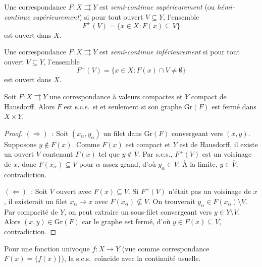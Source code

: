 \begin{definition}
Une correspondance $F\colon X \rightrightarrows Y$ est \emph{semi-continue sup\'erieurement}
(ou \emph{h\'emi-continue sup\'erieurement}) si pour tout ouvert $V \subseteq Y$,
l'ensemble
\[
  F^+(V) = \{x \in X : F(x) \subseteq V\}
\]
est ouvert dans $X$.
\end{definition}

\begin{definition}
Une correspondance $F\colon X \rightrightarrows Y$ est \emph{semi-continue inf\'erieurement}
si pour tout ouvert $V \subseteq Y$, l'ensemble
\[
  F^-(V) = \{x \in X : F(x) \cap V \neq \emptyset\}
\]
est ouvert dans $X$.
\end{definition}

\begin{proposition}
\label{prop:graphe-ferme}
Soit $F\colon X \rightrightarrows Y$ une correspondance \`a valeurs compactes et $Y$
compact de Hausdorff. Alors $F$ est s.c.s.\ si et seulement si son graphe
$\mathrm{Gr}(F)$ est ferm\'e dans $X \times Y$.
\end{proposition}

\begin{proof}
$(\Rightarrow)$~: Soit $(x_\alpha, y_\alpha)$ un filet dans $\mathrm{Gr}(F)$ convergeant
vers $(x, y)$. Supposons $y \notin F(x)$. Comme $F(x)$ est compact et $Y$ est de
Hausdorff, il existe un ouvert $V$ contenant $F(x)$ tel que $y \notin \overline{V}$.
Par s.c.s., $F^+(V)$ est un voisinage de $x$, donc $F(x_\alpha) \subseteq V$ pour $\alpha$
assez grand, d'o\`u $y_\alpha \in V$. \`A la limite, $y \in \overline{V}$, contradiction.

$(\Leftarrow)$~: Soit $V$ ouvert avec $F(x) \subseteq V$. Si $F^+(V)$ n'\'etait pas un
voisinage de $x$, il existerait un filet $x_\alpha \to x$ avec $F(x_\alpha) \not\subseteq V$.
On trouverait $y_\alpha \in F(x_\alpha) \setminus V$. Par compacit\'e de $Y$, on peut
extraire un sous-filet convergeant vers $y \in Y \setminus V$. Alors $(x,y) \in \mathrm{Gr}(F)$
car le graphe est ferm\'e, d'o\`u $y \in F(x) \subseteq V$, contradiction.
\end{proof}

\begin{remarque}
Pour une fonction univoque $f\colon X \to Y$ (vue comme correspondance $F(x) = \{f(x)\}$),
la s.c.s.\ co\"incide avec la continuit\'e usuelle.
\end{remarque}

